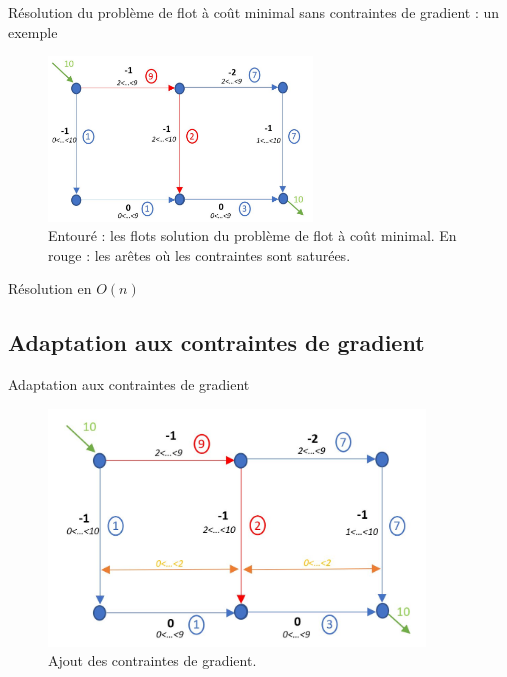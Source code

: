 \documentclass{beamer}
\begin{document}
\begin{frame}{Résolution du problème de flot à coût minimal sans contraintes de gradient : un exemple}
    \begin{figure}
        \centering
        \includegraphics[width = 7cm]{solsanscont.JPG}
        \caption{Entouré : les flots solution du problème de flot à coût minimal. En rouge : les arêtes où les contraintes sont saturées.}
        \label{fig:resosansgrad}
    \end{figure}    
    Résolution en $O(n)$
\insertframenumber\end{frame}

\subsection{Adaptation aux contraintes de gradient}

\begin{frame}{Adaptation aux contraintes de gradient}
    \begin{figure}[H]
        \centering
        \includegraphics[width=10cm]{ajoutgrad.JPG}
        \caption{Ajout des contraintes de gradient.}
        \label{fig:ajoutcontgrad}
    \end{figure}
\insertframenumber
\end{frame}
\end{document}
